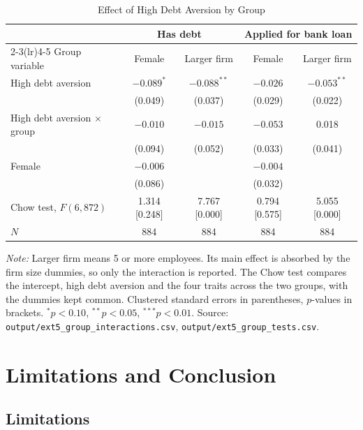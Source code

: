 \documentclass[preprint,letterpaper,11pt,authoryear]{elsarticle}
\newenvironment{tablenotes}{\par\vspace{3pt}\begin{minipage}{0.95\linewidth}\footnotesize\textit{Note:} }{\end{minipage}}
\begin{document}
\begin{table}[!htbp]
\centering\small\setlength{\tabcolsep}{3pt}
\caption{Effect of High Debt Aversion by Group}
\label{tab:groups}
\begin{tabular}{lcccc}
\toprule
 & \multicolumn{2}{c}{Has debt} & \multicolumn{2}{c}{Applied for bank loan} \\
\cmidrule(lr){2-3}\cmidrule(lr){4-5}
Group variable & Female & Larger firm & Female & Larger firm \\
\midrule
High debt aversion & $-0.089^{*}$ & $-0.088^{**}$ & $-0.026$ & $-0.053^{**}$ \\
 & (0.049) & (0.037) & (0.029) & (0.022) \\
High debt aversion $\times$ group & $-0.010$ & $-0.015$ & $-0.053$ & 0.018 \\
 & (0.094) & (0.052) & (0.033) & (0.041) \\
Female & $-0.006$ & & $-0.004$ & \\
 & (0.086) & & (0.032) & \\
\midrule
Chow test, $F(6, 872)$ & 1.314 [0.248] & 7.767 [0.000] & 0.794 [0.575] & 5.055 [0.000] \\
$N$ & 884 & 884 & 884 & 884 \\
\bottomrule
\end{tabular}
\begin{tablenotes}
Larger firm means 5 or more employees. Its main effect is absorbed by the firm size dummies, so only the interaction is reported. The Chow test compares the intercept, high debt aversion and the four traits across the two groups, with the dummies kept common. Clustered standard errors in parentheses, $p$-values in brackets. $^{*}p<0.10$, $^{**}p<0.05$, $^{***}p<0.01$. Source: \texttt{output/ext5\_group\_interactions.csv}, \texttt{output/ext5\_group\_tests.csv}.
\end{tablenotes}
\end{table}

\section{Limitations and Conclusion}

\subsection{Limitations}
\end{document}

